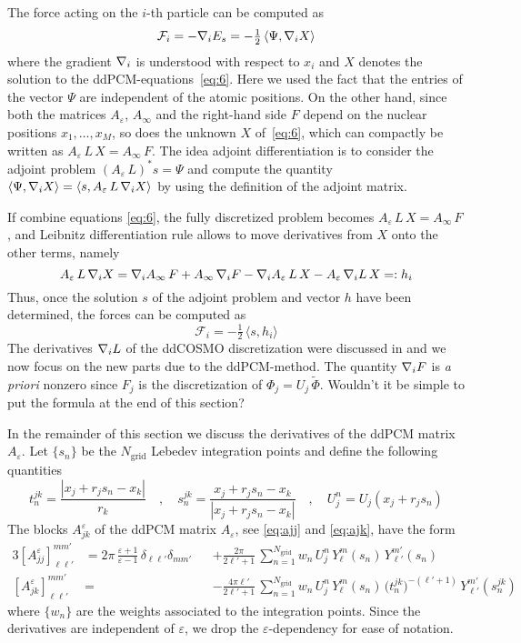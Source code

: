 The force acting on the $i$-th particle can be computed as
\[
\mathcal{F}_i = -\nabla_i E_s = - \tfrac{1}{2} 
\,  \langle \Psi, \nabla_i X \rangle 
\]
where the gradient $\nabla_i$ is understood with respect to $x_i$ and $X$ denotes the solution to the ddPCM-equations~\eqref{eq:6}. 
Here we used the fact that the entries of the vector $\Psi$ are independent of the atomic positions. On the other hand, since both the matrices $A_\varepsilon$, $A_\infty$ and the right-hand side $F$ depend on the nuclear positions $x_1 , \ldots, x_M$, so does the unknown $X$ of~\eqref{eq:6}, which can compactly be written as $A_\varepsilon \, L \, X = A_\infty \, F$.
The idea adjoint differentiation is to consider the adjoint problem $(A_\varepsilon \, L)^* s = \Psi$ and compute the quantity $\langle \Psi, \nabla_i X \rangle = \langle s ,  A_\varepsilon \, L \, \nabla_i X\rangle$ by using the definition of the adjoint matrix.

If combine equations \eqref{eq:6}, the fully discretized problem becomes $A_\varepsilon \, L \, X = A_\infty \, F$, and Leibnitz differentiation rule allows to move derivatives from $X$ onto the other terms, namely
\[
A_\varepsilon \, L \, \nabla_i X = \nabla_i A_\infty \, F +  A_\infty \, \nabla_i F - \nabla_i A_\varepsilon \, L \, X -  A_\varepsilon \, \nabla_i L \, X=: h_i
\]
Thus, once the solution $s$ of the adjoint problem and vector $h$ have been determined, the forces can be computed as
\[
\mathcal{F}_i =  - \tfrac{1}{2} 
 \,  \langle s, h_i \rangle
\]
The derivatives $\nabla_i L $ of the ddCOSMO discretization were discussed in \cite{Lipparini_JCTC_ddCOSMO} and we now focus on the new parts due to the ddPCM-method. The quantity $\nabla_i F$ is \emph{a priori} nonzero since $F_j$ is the discretization of $\Phi_j = U_j \, \tilde{\Phi}$. 
\color{red} Wouldn't it be simple to put the formula at the end of this section? \color{black}

In the remainder of this section we discuss the derivatives of the ddPCM matrix $A_\varepsilon$.
Let $\{ s_n\}$ be the $N_\text{grid}$ Lebedev integration points and define the following quantities
\[
t_n^{jk} = \frac{|x_j + r_j s_n -x_k|}{r_k} \quad , \quad s_n^{jk} = \frac{x_j + r_j s_n -x_k}{|x_j + r_j s_n -x_k|}\quad , \quad U_j^n = U_j(x_j + r_j s_n)
\]
The blocks $A_{jk}^\varepsilon$ of the ddPCM matrix $A_\varepsilon$, see \eqref{eq:ajj} and \eqref{eq:ajk}, have the form
\begin{alignat*}{3}
{[A_{jj}^\varepsilon]}_{\ell \ell'}^{mm'}& = 2\pi \, \frac{\varepsilon + 1}{\varepsilon - 1}\, \delta_{\ell \ell'} \delta_{m m'}&& + \frac{2\pi}{2 \ell' + 1} \,\sum_{n= 1}^{N_\text{grid}} w_n \, U_j^n  \,Y_\ell^m(s_n) \,  Y_{\ell'}^{m'}(s_n) \\
{[A_{jk}^\varepsilon]}_{\ell \ell'}^{mm'}& =&& -  \frac{4 \pi \ell'}{2 \ell'+1} \, \sum_{n= 1}^{N_\text{grid}} w_n\, U_j^n  \, Y_\ell^m(s_n) \, \big( t_n^{jk}\big)^{-(\ell'+1)} \, Y_{\ell'}^{m'} (s_n^{jk})
\end{alignat*}
where $\{ w_n\}$ are the weights associated to the integration points. Since the derivatives are independent of $\varepsilon$, we drop the $\varepsilon$-dependency for ease of notation.

